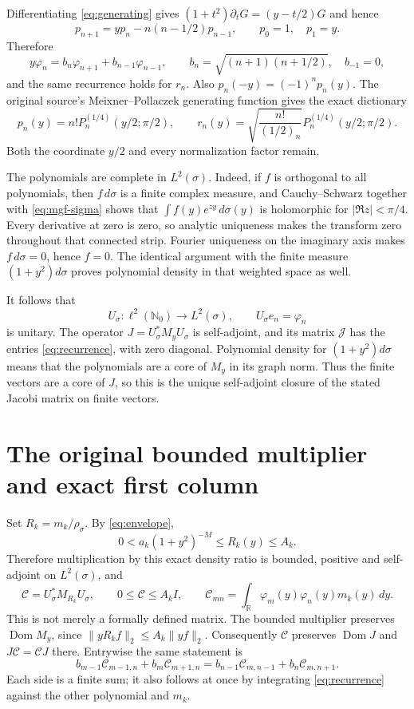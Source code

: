 \documentclass[11pt]{article}
\newcommand{\R}{\mathbb R}
\newcommand{\N}{\mathbb N}
\newcommand{\J}{\mathcal J}
\newcommand{\CC}{\mathcal C}
\newcommand{\Dom}{\operatorname{Dom}}
\begin{document}
Differentiating \eqref{eq:generating} gives
$(1+t^2)\partial_tG=(y-t/2)G$ and hence
\[
 p_{n+1}=yp_n-n(n-1/2)p_{n-1},\qquad p_0=1,\quad p_1=y.
\]
Therefore
\begin{equation}\label{eq:recurrence}
 y\varphi_n=b_n\varphi_{n+1}+b_{n-1}\varphi_{n-1},\qquad
 b_n=\sqrt{(n+1)(n+1/2)},\quad b_{-1}=0,
\end{equation}
and the same recurrence holds for $r_n$. Also $p_n(-y)=(-1)^np_n(y)$.
The original source's Meixner--Pollaczek generating function gives
the exact dictionary
\[
 p_n(y)=n!P_n^{(1/4)}(y/2;\pi/2),\qquad
 r_n(y)=\sqrt{\frac{n!}{(1/2)_n}}P_n^{(1/4)}(y/2;\pi/2).
\]
Both the coordinate $y/2$ and every normalization factor remain.

The polynomials are complete in $L^2(\sigma)$. Indeed, if $f$ is
orthogonal to all polynomials, then $f\,d\sigma$ is a finite complex
measure, and Cauchy--Schwarz together with
\eqref{eq:mgf-sigma} shows that
$\int f(y)e^{zy}\,d\sigma(y)$ is holomorphic for $|\Re z|<\pi/4$.
Every derivative at zero is zero, so analytic uniqueness makes
the transform zero throughout that connected strip. Fourier
uniqueness on the imaginary axis makes $f\,d\sigma=0$, hence $f=0$.
The identical argument with the finite measure $(1+y^2)d\sigma$
proves polynomial density in that weighted space as well.

It follows that
\[
 U_\sigma:\ell^2(\N_0)\longrightarrow L^2(\sigma),\qquad
 U_\sigma e_n=\varphi_n
\]
is unitary. The operator $J=U_\sigma^*M_yU_\sigma$ is self-adjoint,
and its matrix $\J$ has the entries \eqref{eq:recurrence}, with zero
diagonal. Polynomial density for $(1+y^2)d\sigma$ means that the
polynomials are a core of $M_y$ in its graph norm. Thus the finite
vectors are a core of $J$, so this is the unique self-adjoint closure
of the stated Jacobi matrix on finite vectors.

\section{The original bounded multiplier and exact first column}

Set $R_k=m_k/\rho_\sigma$. By \eqref{eq:envelope},
\[
 0<a_k(1+y^2)^{-M}\leq R_k(y)\leq A_k.
\]
Therefore multiplication by this exact density ratio is bounded,
positive and self-adjoint on $L^2(\sigma)$, and
\begin{equation}\label{eq:operator}
 \CC=U_\sigma^*M_{R_k}U_\sigma,\qquad
 0\leq\CC\leq A_k I,\qquad
 \CC_{mn}=\int_\R\varphi_m(y)\varphi_n(y)m_k(y)\,dy.
\end{equation}
This is not merely a formally defined matrix. The bounded multiplier
preserves $\Dom M_y$, since
$\|yR_k f\|_2\leq A_k\|yf\|_2$. Consequently $\CC$ preserves
$\Dom J$ and $J\CC=\CC J$ there. Entrywise the same statement is
\[
 b_{m-1}\CC_{m-1,n}+b_m\CC_{m+1,n}
 =b_{n-1}\CC_{m,n-1}+b_n\CC_{m,n+1}.
\]
Each side is a finite sum; it also follows at once by integrating
\eqref{eq:recurrence} against the other polynomial and $m_k$.
\end{document}
